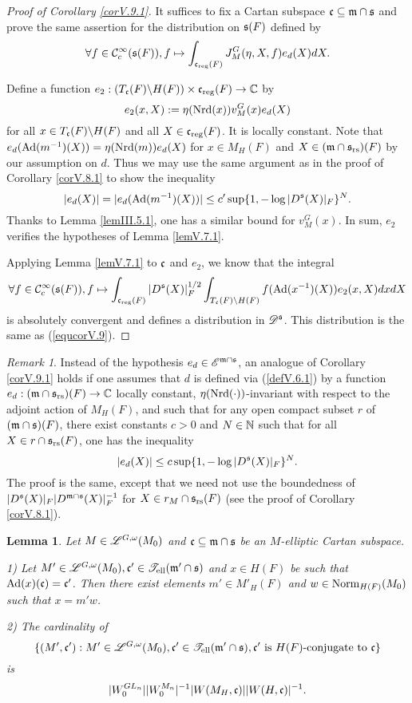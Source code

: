 \documentclass[a4paper]{amsart}
\newcommand{\mse}{\mathscr{E}}\newcommand{\msf}{\mathscr{F}}\newcommand{\msg}{\mathscr{G}}\newcommand{\msh}{\mathscr{H}}
\newcommand{\fm}{{\mathfrak{m}}} \newcommand{\fn}{{\mathfrak{n}}}\newcommand{\fo}{{\mathfrak{o}}} \newcommand{\fp}{{\mathfrak{p}}}
\newtheorem{lem}[thm]{Lemma}
\theoremstyle{definition}
\theoremstyle{remark}
\newtheorem{remark}[thm]{Remark}
\numberwithin{equation}{subsection}
\begin{document}
\begin{proof}[Proof of Corollary \ref{corV.9.1}]
It suffices to fix a Cartan subspace $\fc\subseteq\fm\cap\fs$ and prove the same assertion for the distribution on ${\mathfrak{s}}(F)$ defined by
\begin{equation}\label{equcorV.9}
 \forall f\in{\mathcal {C}}_c^\infty({\mathfrak{s}}(F)), f\mapsto\int_{{\mathfrak{c}}_{\mathrm{reg}}(F)} J_M^G(\eta, X, f) e_d(X) dX. 
\end{equation}

Define a function $e_2: (T_{\mathfrak{c}}(F)\backslash H(F))\times{\mathfrak{c}}_{\mathrm{reg}}(F)\rightarrow{\mathbb {C}}$ by
\begin{equation}\label{equpfcorV.9}
 e_2(x,X):=\eta({\mathrm{Nrd}}(x))v_M^G(x)e_d(X) 
\end{equation}
for all $x\in T_{\mathfrak{c}}(F)\backslash H(F)$ and all $X\in{\mathfrak{c}}_{\mathrm{reg}}(F)$. It is locally constant. Note that $e_d({\mathrm{Ad}}(m^{-1})(X))=\eta({\mathrm{Nrd}}(m))e_d(X)$ for $x\in M_H(F)$ and $X\in(\fm\cap\fs_\rs)(F)$ by our assumption on $d$. Thus we may use the same argument as in the proof of Corollary \ref{corV.8.1} to show the inequality
$$ |e_d(X)|=|e_d({\mathrm{Ad}}(m^{-1})(X))|\leq c'\sup\{1, -\log |D^{\mathfrak{s}}(X)|_F\}^N. $$
Thanks to Lemma \ref{lemIII.5.1}, one has a similar bound for $v_M^G(x)$. In sum, $e_2$ verifies the hypotheses of Lemma \ref{lemV.7.1}. 

Applying Lemma \ref{lemV.7.1} to ${\mathfrak{c}}$ and $e_2$, we know that the integral
$$ \forall f\in{\mathcal {C}}_c^\infty({\mathfrak{s}}(F)), f\mapsto\int_{{\mathfrak{c}}_{\mathrm{reg}}(F)} |D^{\mathfrak{s}}(X)|_F^{1/2} \int_{T_{\mathfrak{c}}(F)\backslash H(F)} f({\mathrm{Ad}}(x^{-1})(X)) e_2(x, X) dx dX $$
is absolutely convergent and defines a distribution in $\mathscr{D}^{\mathfrak{s}}$. This distribution is the same as (\ref{equcorV.9}). 
\end{proof}

\begin{remark}
Instead of the hypothesis $e_d\in\mse^{\fm\cap\fs}$, an analogue of Corollary \ref{corV.9.1} holds if one assumes that $d$ is defined via (\ref{defV.6.1}) by a function $e_d:(\fm\cap\fs_\rs)(F)\ra\BC$ locally constant, $\eta({\mathrm{Nrd}}(\cdot))$-invariant with respect to the adjoint action of $M_H(F)$, and such that for any open compact subset $r$ of $(\fm\cap\fs)(F)$, there exist constants $c>0$ and $N\in{\mathbb {N}}$ such that for all $X\in r\cap{\mathfrak{s}}_{\mathrm{rs}}(F)$, one has the inequality
$$ |e_d(X)|\leq c\sup\{1, -\log |D^{\mathfrak{s}}(X)|_F\}^N. $$
The proof is the same, except that we need not use the boundedness of $|D^\fs(X)|_F|D^{\fm\cap\fs}(X)|_F^{-1}$ for $X\in r_M\cap{\mathfrak{s}}_{\mathrm{rs}}(F)$ (see the proof of Corollary \ref{corV.8.1}). 
\end{remark}

\begin{lem}\label{countlemforrepr1}
Let $M\in\mathscr{L}^{G,\omega}(M_0)$ and $\fc\subseteq\fm\cap\fs$ be an $M$-elliptic Cartan subspace. 

1) Let $M'\in\msl^{G,\omega}(M_0), \fc'\in\mst_\el(\fm'\cap\fs)$ and $x\in H(F)$ be such that ${\mathrm{Ad}}(x)({\mathfrak{c}})={\mathfrak{c}}'$. Then there exist elements $m'\in M'_H(F)$ and $w\in{\mathrm{Norm}}_{H(F)}(M_0)$ such that $x=m'w$. 

2) The cardinality of
$$ \{(M',\fc'): M'\in\msl^{G,\omega}(M_0), \fc'\in\mst_\el(\fm'\cap\fs), \fc'\text{ is }H(F)\text{-conjugate to }\fc\} $$
is
$$ |W_0^{GL_n}||W_0^{M_n}|^{-1}|W(M_H,{\mathfrak{c}})||W(H,{\mathfrak{c}})|^{-1}. $$
\end{lem}
\end{document}
